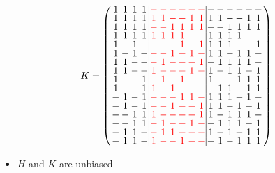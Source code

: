 \documentclass{beamer}
\newcommand{\rred}[1]{\textcolor{red}{#1}}
\begin{document}
\begin{frame}

  \[
    K=
    \arraycolsep=1.0pt\def\arraystretch{0.75}
    \left(
      \begin{array}{cccc|cccccc|cccccc}
        1&1&1&1&\rred{-}&\rred{-}&\rred{-}&\rred{-}&\rred{-}&\rred{-}&-&-&-&-&-&-\\
        1&1&1&1&\rred{1}&\rred{1}&\rred{-}&\rred{-}&\rred{1}&\rred{1}&1&1&-&-&1&1\\
        1&1&1&1&\rred{-}&\rred{-}&\rred{1}&\rred{1}&\rred{1}&\rred{1}&-&-&1&1&1&1\\
        1&1&1&1&\rred{1}&\rred{1}&\rred{1}&\rred{1}&\rred{-}&\rred{-}&1&1&1&1&-&-\\
        1&-&1&-&\rred{-}&\rred{-}&\rred{-}&\rred{1}&\rred{-}&\rred{1}&1&1&1&-&-&1\\
        1&-&1&-&\rred{-}&\rred{-}&\rred{1}&\rred{-}&\rred{1}&\rred{-}&1&1&-&1&1&-\\
        1&1&-&-&\rred{-}&\rred{1}&\rred{-}&\rred{-}&\rred{-}&\rred{1}&-&1&1&1&1&-\\
        1&1&-&-&\rred{1}&\rred{-}&\rred{-}&\rred{-}&\rred{1}&\rred{-}&1&-&1&1&-&1\\
        1&-&-&1&\rred{-}&\rred{1}&\rred{-}&\rred{1}&\rred{-}&\rred{-}&1&-&-&1&1&1\\
        1&-&-&1&\rred{1}&\rred{-}&\rred{1}&\rred{-}&\rred{-}&\rred{-}&-&1&1&-&1&1\\
        -&1&-&1&\rred{-}&\rred{-}&\rred{-}&\rred{1}&\rred{1}&\rred{-}&1&1&1&-&1&-\\
        -&1&-&1&\rred{-}&\rred{-}&\rred{1}&\rred{-}&\rred{-}&\rred{1}&1&1&-&1&-&1\\
        -&-&1&1&\rred{1}&\rred{-}&\rred{-}&\rred{-}&\rred{-}&\rred{1}&1&-&1&1&1&-\\
        -&-&1&1&\rred{-}&\rred{1}&\rred{-}&\rred{-}&\rred{1}&\rred{-}&-&1&1&1&-&1\\
        -&1&1&-&\rred{-}&\rred{1}&\rred{1}&\rred{-}&\rred{-}&\rred{-}&1&-&1&-&1&1\\
        -&1&1&-&\rred{1}&\rred{-}&\rred{-}&\rred{1}&\rred{-}&\rred{-}&-&1&-&1&1&1\\
      \end{array}
    \right)
  \]

  \begin{itemize}
    \item $H$ and $K$ are unbiased
  \end{itemize}
  
\end{frame}
\end{document}
